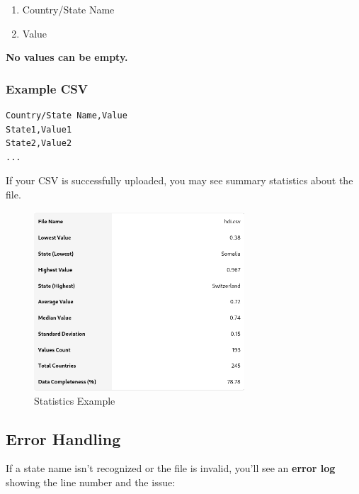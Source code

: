 \documentclass{article}
\begin{document}
\begin{enumerate}
  \item Country/State Name
  \item Value
\end{enumerate}

\noindent
\textbf{No values can be empty.}

\subsubsection*{Example CSV}

\begin{verbatim}
Country/State Name,Value
State1,Value1
State2,Value2
...
\end{verbatim}

If your CSV is successfully uploaded, you may see summary statistics about the file.

\begin{figure}[h!]
  \centering
  \includegraphics[width=0.7\textwidth]{stats.png}
  \caption{Statistics Example}
\end{figure}

\subsection{Error Handling}

If a state name isn’t recognized or the file is invalid, you’ll see an 
\textbf{error log} showing the line number and the issue:
\end{document}
